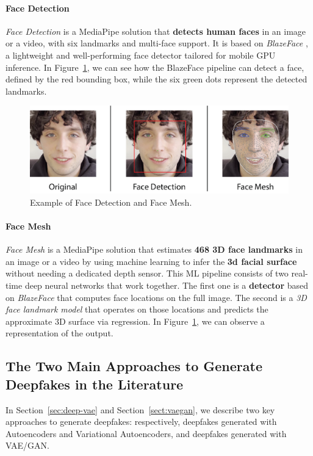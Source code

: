 \documentclass[sn-mathphys,Numbered]{sn-jnl}
\theoremstyle{thmstyleone}%
\theoremstyle{thmstyletwo}%
\theoremstyle{thmstylethree}%
\begin{document}
\paragraph{Face Detection}


\emph{Face Detection} is a MediaPipe solution that \textbf{detects human faces} in an image or a video,
with six landmarks and multi-face support.
It is based on \emph{BlazeFace} \cite{bazarevsky2019blazeface}, a lightweight and well-performing 
face detector tailored for mobile GPU inference.
In Figure~\ref{fig:MediapipeDemo}, we can see how the BlazeFace pipeline can detect a face, defined by the red bounding box, while the six green dots represent the detected landmarks.

\begin{figure}[t]
	\centering
	\includegraphics[scale=0.65, keepaspectratio]{img/background_img/MediapipeDemo.png}
	\caption{Example of Face Detection and Face Mesh.}\label{fig:MediapipeDemo}
\end{figure}


\paragraph{Face Mesh}
\emph{Face Mesh} is a MediaPipe solution that estimates \textbf{468 3D face landmarks} in an image or a video by using machine learning to infer the \textbf{3d facial surface} without needing a dedicated depth sensor.
This ML pipeline consists of two real-time deep neural networks that work together.
The first one is a \textbf{detector} based on \emph{BlazeFace} that computes face locations on the full image.
The second is a \emph{3D face landmark model} \cite{kartynnik2019realtime} that operates on those locations and predicts the 
approximate 3D surface via regression. In Figure~\ref{fig:MediapipeDemo}, we can observe a representation of the output.


\subsection{The Two Main Approaches to Generate Deepfakes in the Literature}\label{section:vaegan}
In Section~\ref{sec:deep-vae} and Section~\ref{sect:vaegan}, we describe two key approaches to generate deepfakes: respectively, deepfakes generated with Autoencoders and Variational Autoencoders, and deepfakes generated with VAE/GAN.
\end{document}
